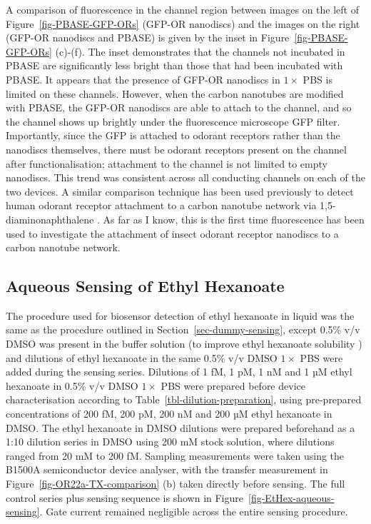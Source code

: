 \documentclass[
  a4paper,
]{scrbook}
\begin{document}
A comparison of fluorescence in the channel region between images on the
left of Figure~\ref{fig-PBASE-GFP-ORs} (GFP-OR nanodiscs) and the images
on the right (GFP-OR nanodiscs and PBASE) is given by the inset in
Figure~\ref{fig-PBASE-GFP-ORs} (c)-(f). The inset demonstrates that the
channels not incubated in PBASE are significantly less bright than those
that had been incubated with PBASE. It appears that the presence of
GFP-OR nanodiscs in \(1 \times\) PBS is limited on these channels.
However, when the carbon nanotubes are modified with PBASE, the GFP-OR
nanodiscs are able to attach to the channel, and so the channel shows up
brightly under the fluorescence microscope GFP filter. Importantly,
since the GFP is attached to odorant receptors rather than the nanodiscs
themselves, there must be odorant receptors present on the channel after
functionalisation; attachment to the channel is not limited to empty
nanodiscs. This trend was consistent across all conducting channels on
each of the two devices. A similar comparison technique has been used
previously to detect human odorant receptor attachment to a carbon
nanotube network via 1,5-diaminonaphthalene \autocite{Lee2012b}. As far
as I know, this is the first time fluorescence has been used to
investigate the attachment of insect odorant receptor nanodiscs to a
carbon nanotube network.

\hypertarget{sec-EtHex-aqueous-sensing}{%
\subsection{Aqueous Sensing of Ethyl
Hexanoate}\label{sec-EtHex-aqueous-sensing}}

The procedure used for biosensor detection of ethyl hexanoate in liquid
was the same as the procedure outlined in
Section~\ref{sec-dummy-sensing}, except 0.5\% v/v DMSO was present in
the buffer solution (to improve ethyl hexanoate solubility
\autocite{Galvao2014}) and dilutions of ethyl hexanoate in the same
0.5\% v/v DMSO \(1 \times\) PBS were added during the sensing series.
Dilutions of 1 fM, 1 pM, 1 nM and 1 µM ethyl hexanoate in 0.5\% v/v DMSO
\(1 \times\) PBS were prepared before device characterisation according
to Table~\ref{tbl-dilution-preparation}, using pre-prepared
concentrations of 200 fM, 200 pM, 200 nM and 200 µM ethyl hexanoate in
DMSO. The ethyl hexanoate in DMSO dilutions were prepared beforehand as
a 1:10 dilution series in DMSO using 200 mM stock solution, where
dilutions ranged from 20 mM to 200 fM. Sampling measurements were taken
using the B1500A semiconductor device analyser, with the transfer
measurement in Figure~\ref{fig-OR22a-TX-comparison} (b) taken directly
before sensing. The full control series plus sensing sequence is shown
in Figure~\ref{fig-EtHex-aqueous-sensing}. Gate current remained
negligible across the entire sensing procedure.
\end{document}
